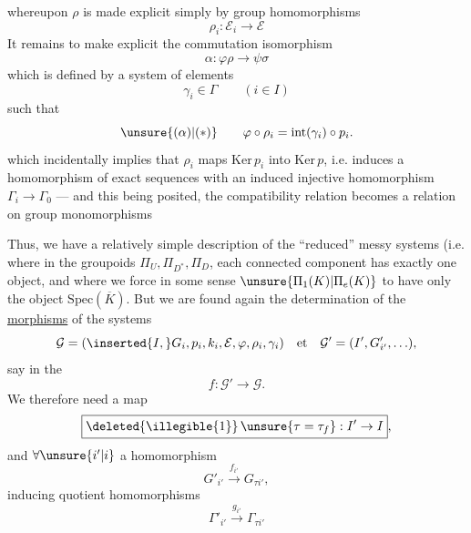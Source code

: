 
whereupon $\rho$ is made explicit simply by
group homomorphisms
\[
\boxed{\rho_i:\mathcal E_i\longrightarrow\mathcal E}
\]
It remains to make explicit the commutation isomorphism
\[
\alpha:\varphi\rho\to\psi\sigma
\]
which is defined by a system of elements
\[
\boxed{\gamma_i\in\Gamma\qquad(i\in I)}
\]
such that
\[
\unsure{(\alpha)|(*)}\qquad
\varphi\circ\rho_i=\mathrm{int}(\gamma_i)\circ p_i.
\]
which incidentally implies that $\rho_i$ 
maps $\mathrm{Ker}\,p_i$ into $\mathrm{Ker}\,p$, i.e. induces
a homomorphism of exact sequences
with an induced injective homomorphism $\Gamma_i\to\Gamma_0$
--- and this being posited, the compatibility relation
\unsure{$(\alpha)$|$(*)$} becomes a relation on
group monomorphisms



Thus, we have a relatively simple description of the
``reduced'' messy systems (i.e. where in the groupoids
$\Pi_U,\Pi_{D^*},\Pi_D$, each connected component has exactly
one object, and where  we force in some sense
$\unsure{\Pi_1(K)|\Pi_e(K)}$ to have only the object
$\mathrm{Spec}(\overline K)$.
But we are found again 
 the determination of the \uline{morphisms} of the systems
\[
\mathcal G=(\inserted{I,}G_i,p_i,k_i,\mathcal E,\varphi,\rho_i,
\gamma_i)
\quad\hbox{et}\quad
\mathcal G'=(I',G'_{i'},\ldots),
\]
 say in the 
\[
f:\mathcal G'\to\mathcal G.
\]
We therefore need  a map
\[
\boxed{\deleted{\illegible{1}}\,\unsure{\tau=\tau_f}:I'\to I},
\]
and $\forall\unsure{i'|i}$ a homomorphism
\[
\boxed{G'_{i'}\xrightarrow{f_{i'}}G_{\tau i'}},
\]
inducing  quotient homomorphisms
\[
\Gamma'_{i'}\xrightarrow{g_{i'}}\Gamma_{\tau i'}
\]

